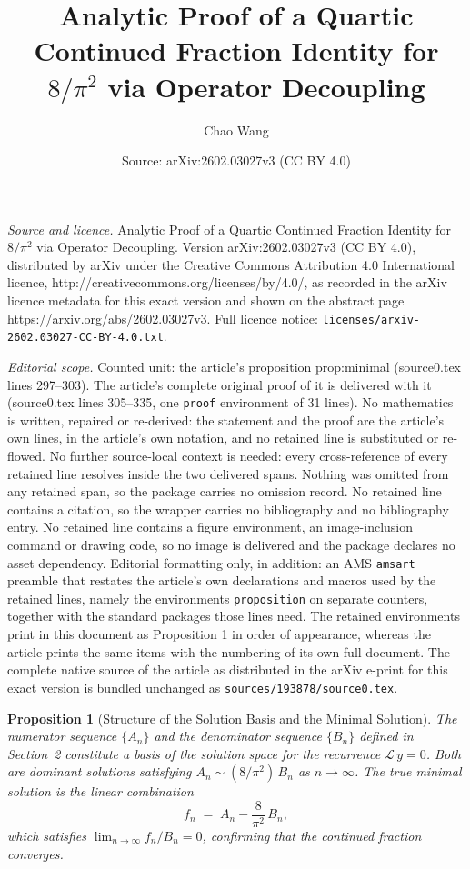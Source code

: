 \documentclass[10pt,a4paper]{amsart}
\title{Analytic Proof of a Quartic Continued Fraction Identity for $8/\pi^2$ via Operator Decoupling}
\author{Chao Wang}
\date{Source: arXiv:2602.03027v3 (CC BY 4.0)}
\newtheorem{proposition}{Proposition}
\begin{document}
\maketitle

\noindent\emph{Source and licence.} Analytic Proof of a Quartic Continued Fraction Identity for $8/\pi^2$ via Operator Decoupling. Version arXiv:2602.03027v3 (CC BY 4.0), distributed by arXiv under the Creative Commons Attribution 4.0 International licence, http://creativecommons.org/licenses/by/4.0/, as recorded in the arXiv licence metadata for this exact version and shown on the abstract page https://arxiv.org/abs/2602.03027v3. Full licence notice: \texttt{licenses/arxiv-2602.03027-CC-BY-4.0.txt}.\par\smallskip

\noindent\textit{Editorial scope.} Counted unit: the article's proposition prop:minimal (source0.tex lines 297--303). The article's complete original proof of it is delivered with it (source0.tex lines 305--335, one \texttt{proof} environment of 31 lines). No mathematics is written, repaired or re-derived: the statement and the proof are the article's own lines, in the article's own notation, and no retained line is substituted or re-flowed.  No further source-local context is needed: every cross-reference of every retained line resolves inside the two delivered spans.  Nothing was omitted from any retained span, so the package carries no omission record.  No retained line contains a citation, so the wrapper carries no bibliography and no bibliography entry.  No retained line contains a figure environment, an image-inclusion command or drawing code, so no image is delivered and the package declares no asset dependency.  Editorial formatting only, in addition: an AMS \texttt{amsart} preamble that restates the article's own declarations and macros used by the retained lines, namely the environments \texttt{proposition} on separate counters, together with the standard packages those lines need.  The retained environments print in this document as Proposition 1 in order of appearance, whereas the article prints the same items with the numbering of its own full document.  The complete native source of the article as distributed in the arXiv e-print for this exact version is bundled unchanged as \texttt{sources/193878/source0.tex}.
	\begin{proposition}[Structure of the Solution Basis and the Minimal Solution]\label{prop:minimal}
		The numerator sequence $\{A_n\}$ and the denominator sequence $\{B_n\}$ defined in Section~2 constitute a basis of the solution space for the recurrence $\mathcal{L}\,y = 0$.  Both are dominant solutions satisfying $A_n \sim (8/\pi^2)\,B_n$ as $n\to\infty$.  The true minimal solution is the linear combination
		\begin{equation}\label{eq:minimal_def}
			f_n \;=\; A_n - \frac{8}{\pi^2}\,B_n,
		\end{equation}
		which satisfies $\lim_{n\to\infty} f_n/B_n = 0$, confirming that the continued fraction converges.
	\end{proposition}
\end{document}
